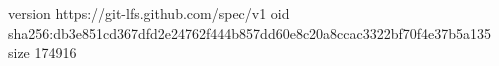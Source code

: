 version https://git-lfs.github.com/spec/v1
oid sha256:db3e851cd367dfd2e24762f444b857dd60e8c20a8ccac3322bf70f4e37b5a135
size 174916
